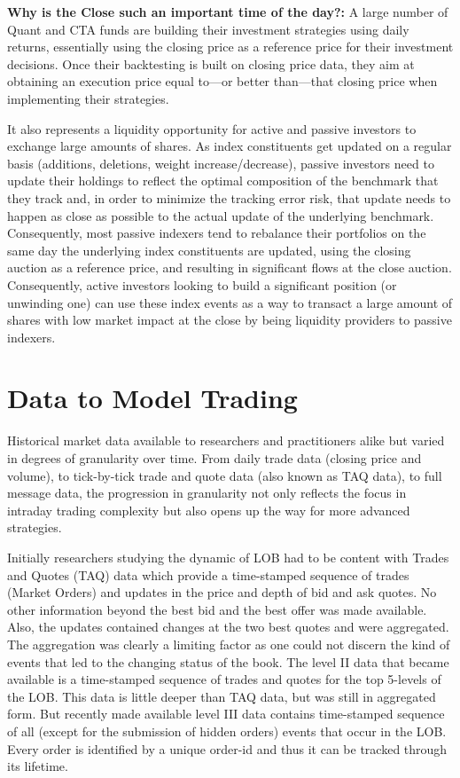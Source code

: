 \noindent\textbf{Why is the Close such an important time of the day?:} A large number of Quant and CTA funds are building their investment strategies using daily returns, essentially using the closing price as a reference price for their investment decisions. Once their backtesting is built on closing price data, they aim at obtaining an execution price equal to---or better than---that closing price when implementing their strategies. 


It also represents a liquidity opportunity for active and passive investors to exchange large amounts of shares. As index constituents get updated on a regular basis (additions, deletions, weight increase/decrease), passive investors need to update their holdings to reflect the optimal composition of the benchmark that they track and, in order to minimize the tracking error risk, that update needs to happen as close as possible to the actual update of the underlying benchmark. Consequently, most passive indexers tend to rebalance their portfolios on the same day the underlying index constituents are updated, using the closing auction as a reference price, and resulting in significant flows at the close auction. Consequently, active investors looking to build a significant position (or unwinding one) can use these index events as a way to transact a large amount of shares with low market impact at the close by being liquidity providers to passive indexers.  



\section{Data to Model Trading}


Historical market data available to researchers and practitioners alike but varied in degrees of granularity over time. From daily trade data (closing price and volume), to tick-by-tick trade and quote data (also known as TAQ data), to full message data, the progression in granularity not only reflects the focus in intraday trading complexity but also opens up the way for more advanced strategies. 


Initially researchers studying the dynamic of LOB had to be content with Trades and Quotes (TAQ) data which provide a time-stamped sequence of trades (Market Orders) and updates in the price and depth of bid and ask quotes. No other information beyond the best bid and the best offer was made available. Also, the updates contained changes at the two best quotes and were aggregated. The aggregation was clearly a limiting factor as one could not discern the kind of events that led to the changing status of the book. The level II data that became available is a time-stamped sequence of trades and quotes for the top 5-levels of the LOB. This data is little deeper than TAQ data, but was still in aggregated form. But recently made available level III data contains time-stamped sequence of all (except for the submission of hidden orders) events that occur in the LOB. Every order is identified by a unique order-id and thus it can be tracked through its lifetime. \\


